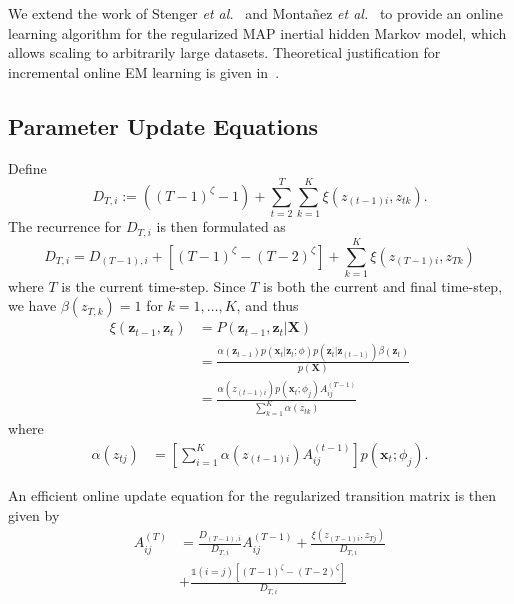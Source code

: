 \documentclass{article}
\begin{document}
We extend the work of Stenger \emph{et
al.}~ and Monta\~nez \emph{et
al.}~ to provide an online learning algorithm for the
regularized MAP inertial hidden Markov model, which allows scaling to arbitrarily large
datasets. Theoretical justification for incremental online EM learning is given
in~\cite{Neal:1999:VEA:308574.308679}.

\subsection{Parameter Update Equations}

Define 
\[
   D_{T,i} := ((T-1)^\zeta -1) + \sum_{t=2}^{T}\sum_{k=1}^{K} \xi(z_{(t-1)i}, z_{tk}).
\]
The recurrence for $D_{T,i}$ is then formulated as
\begin{equation*}
    D_{T,i} = D_{(T-1), i} + [(T-1)^\zeta - (T-2)^\zeta] + \sum_{k=1}^{K}
    \xi(z_{(T-1)i}, z_{Tk})
\end{equation*}
where $T$ is the current time-step. Since $T$ is both the current and final time-step, we have $\beta(z_{T,k}) = 1$ for $k = 1, \ldots, K$, and thus
\begin{align*}
    \xi(\mathbf{z}_{t-1}, \mathbf{z}_{t}) 
            &= P(\mathbf{z}_{t-1}, \mathbf{z}_{t} | \mathbf{X}) \\
            &= \frac{\alpha(\mathbf{z}_{t-1})p(\mathbf{x}_t|\mathbf{z}_t; \phi)p(\mathbf{z}_{t}|\mathbf{z}_{(t-1)})\beta(\mathbf{z}_t)}{p(\mathbf{X})} \\
            &= \frac{\alpha(z_{(t-1)i})p(\mathbf{x}_t; \phi_j)A_{ij}^{(T-1)}}{\sum_{k=1}^{K}\alpha(z_{tk})}
\end{align*}
where
\begin{align*}
    \alpha(z_{tj}) &= \left[\sum_{i=1}^{K} \alpha(z_{(t-1)i})A_{ij}^{(t-1)}\right]p(\mathbf{x}_t; \phi_j).
\end{align*}

An efficient online update equation for the regularized transition matrix is then given by
\begin{align*}
    A_{ij}^{(T)} &= \frac{D_{(T-1), i}}{D_{T,i}}A_{ij}^{(T-1)}
    + \frac{\xi(z_{(T-1)i}, z_{Tj})}{D_{T,i}} \\
                 &+ \frac{\mathds{1}(i = j)[(T-1)^\zeta - (T-2)^\zeta]}{D_{T,i}}
\end{align*}
\end{document}
